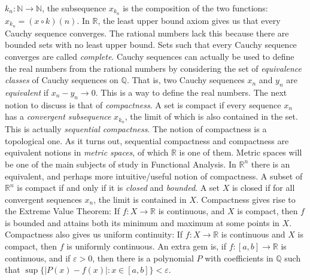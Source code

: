 \documentclass[crop=false,class=article,oneside]{standalone}
\begin{document}
            $k_{n}:\mathbb{N}\rightarrow\mathbb{N}$, the subsequence
            $x_{k_{n}}$ is the composition of the two functions:
            $x_{k_{n}}=(x\circ{k})(n)$.
            In $\mathbb{R}$, the least upper bound axiom gives
            us that every Cauchy sequence converges. The
            rational numbers lack this because there are
            bounded sets with no least upper bound. Sets such
            that every Cauchy sequence converges are called
            \textit{complete}. Cauchy sequences can actually be
            used to define the real numbers from the rational
            numbers by considering the set of
            \textit{equivalence classes} of Cauchy sequences on
            $\mathbb{Q}$. That is, two Cauchy sequences
            $x_{n}$ and $y_{n}$ are \textit{equivalent} if
            $x_{n}-y_{n}\rightarrow{0}$. This is a way to define
            the real numbers. The next notion to discuss is that
            of \textit{compactness}. A set is compact if every
            sequence $x_{n}$ has a \textit{convergent subsequence}
            $x_{k_{n}}$, the limit of which is also contained in
            the set. This is actually
            \textit{sequential compactness}. The notion of
            compactness is a topological one. As it turns out,
            sequential compactness and compactness are
            equivalent notions in \textit{metric spaces}, of
            which $\mathbb{R}$ is one of them. Metric spaces
            will be one of the main subjects of study in
            Functional Analysis. In $\mathbb{R}^{n}$ there is
            an equivalent, and perhaps more intuitive/useful
            notion of compactness. A subset of $\mathbb{R}^{n}$
            is compact if and only if it is
            \textit{closed} and \textit{bounded}. A set $X$ is
            closed if for all convergent sequences $x_{n}$,
            the limit is contained in $X$. Compactness gives rise
            to the Extreme Value Theorem: If $f:X\rightarrow\mathbb{R}$
            is continuous, and $X$ is compact, then $f$ is bounded
            and attains both its minimum and maximum at some points
            in $X$. Compactness also gives us uniform continuity:
            If $f:X\rightarrow\mathbb{R}$ is continuous and $X$
            is compact, then $f$ is uniformly continuous.
            An extra gem is, if $f:[a,b]\rightarrow\mathbb{R}$
            is continuous, and if $\varepsilon>0$, then there is
            a polynomial $P$ with coefficients in $\mathbb{Q}$
            such that $\sup\{|P(x)-f(x)|:x\in[a,b]\}<\varepsilon$.
\end{document}

